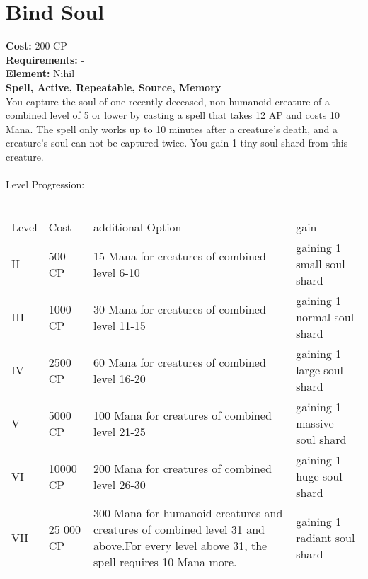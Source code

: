 \section{Bind Soul}
\textbf{Cost:} 200 CP\\
\textbf{Requirements:} -\\
\textbf{Element:} Nihil\\
\textbf{Spell, Active, Repeatable, Source, Memory}\\
You capture the soul of one recently deceased, non humanoid creature of a combined level of 5 or lower by casting a spell that takes 12 AP and costs 10 Mana. The spell only works up to 10 minutes after a creature’s death, and a creature’s soul can not be captured twice. You gain 1 tiny soul shard from this creature.\\
\\
Level Progression:\\
\\
\begin{tabular}{l | l | p{5.5cm} | p{2.5cm}}
    Level & Cost & additional Option & gain\\
    II & 500 CP & 15 Mana for creatures of combined level 6-10 & gaining 1 small soul shard\\
    III & 1000 CP & 30 Mana for creatures of combined level 11-15 & gaining 1 normal soul shard\\
    IV & 2500 CP & 60 Mana for creatures of combined level 16-20 & gaining 1 large soul shard\\
    V & 5000 CP & 100 Mana for creatures of combined level 21-25 & gaining 1 massive soul shard\\
    VI & 10000 CP & 200 Mana for creatures of combined level 26-30 & gaining 1 huge soul shard\\
    VII & 25 000 CP & 300 Mana for humanoid creatures and creatures of combined level 31 and above.\linebreak For every level above 31, the spell requires 10 Mana more. & gaining 1 radiant soul shard\\
\end{tabular}